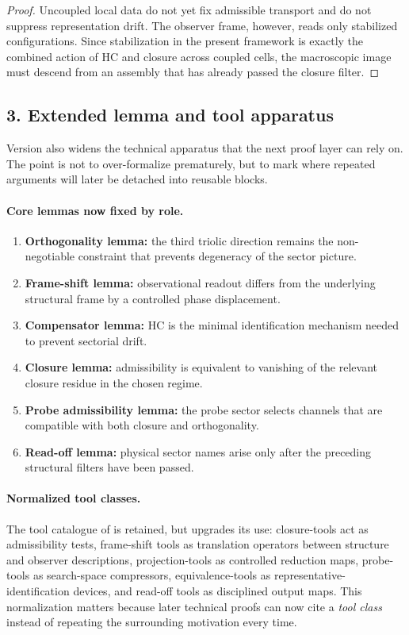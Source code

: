 \begin{proof}
Uncoupled local data do not yet fix admissible transport and do not suppress
representation drift. The observer frame, however, reads only stabilized
configurations. Since stabilization in the present framework is exactly the
combined action of HC and closure across coupled cells, the macroscopic image
must descend from an assembly that has already passed the closure filter.
\end{proof}

\subsection*{3. Extended lemma and tool apparatus}
Version  also widens the technical apparatus that the next proof
layer can rely on. The point is not to over-formalize prematurely, but to mark
where repeated arguments will later be detached into reusable blocks.

\paragraph{Core lemmas now fixed by role.}
\begin{enumerate}[leftmargin=2em]
 \item \textbf{Orthogonality lemma:} the third triolic direction remains the
 non-negotiable constraint that prevents degeneracy of the sector picture.
 \item \textbf{Frame-shift lemma:} observational readout differs from the
 underlying structural frame by a controlled phase displacement.
 \item \textbf{Compensator lemma:} HC is the minimal identification mechanism
 needed to prevent sectorial drift.
 \item \textbf{Closure lemma:} admissibility is equivalent to vanishing of the
 relevant closure residue in the chosen regime.
 \item \textbf{Probe admissibility lemma:} the probe sector selects channels
 that are compatible with both closure and orthogonality.
 \item \textbf{Read-off lemma:} physical sector names arise only after the
 preceding structural filters have been passed.
\end{enumerate}

\paragraph{Normalized tool classes.}
The tool catalogue of  is retained, but  upgrades its use:
closure-tools act as admissibility tests, frame-shift tools as translation
operators between structure and observer descriptions, projection-tools as
controlled reduction maps, probe-tools as search-space compressors,
equivalence-tools as representative-identification devices, and read-off tools
as disciplined output maps. This normalization matters because later technical
proofs can now cite a \emph{tool class} instead of repeating the surrounding
motivation every time.

